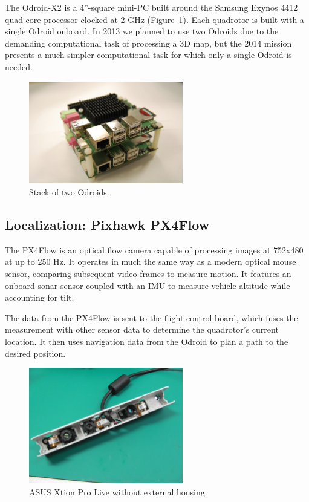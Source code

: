 \documentclass[12pt,letterpaper]{article} \usepackage[margin=1in]{geometry}
\begin{document}
The Odroid-X2 is a 4''-square mini-PC built around the Samsung Exynos 4412
quad-core processor clocked at 2 GHz (Figure~\ref{fig:odroids}). Each
quadrotor is built with a single Odroid onboard. In 2013 we planned to use two
Odroids due to the demanding computational task of processing a 3D map, but the
2014 mission presents a much simpler computational task for which only a single
Odroid is needed.

\begin{figure}[!h]
	\centering
	\includegraphics[width=0.6\textwidth]{img/odroid_stack.jpg}
	\caption{Stack of two Odroids.}
	\label{fig:odroids}
\end{figure}


\subsection*{Localization: Pixhawk PX4Flow}

The PX4Flow is an optical flow camera capable of processing images at 752x480
at up to 250 Hz. It operates in much the same way as a modern optical mouse
sensor, comparing subsequent video frames to measure motion. It features an
onboard sonar sensor coupled with an IMU to measure vehicle altitude while
accounting for tilt.

The data from the PX4Flow is sent to the flight control board, which fuses the
measurement with other sensor data to determine the quadrotor's current
location. It then uses navigation data from the Odroid to plan a path to the
desired position.

\begin{figure}[!h]
	\centering
	\includegraphics[width=0.6\textwidth]{img/xtion.jpg}
	\caption{ASUS Xtion Pro Live without external housing.}
	\label{fig:xtion}
\end{figure}
\end{document}
